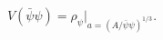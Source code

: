 \begin{equation}
  V(\bar{\psi}\psi)
  =\rho_\psi\big|_{a=(A/ \bar{\psi}\psi)^{1/3}}.
\end{equation} 
